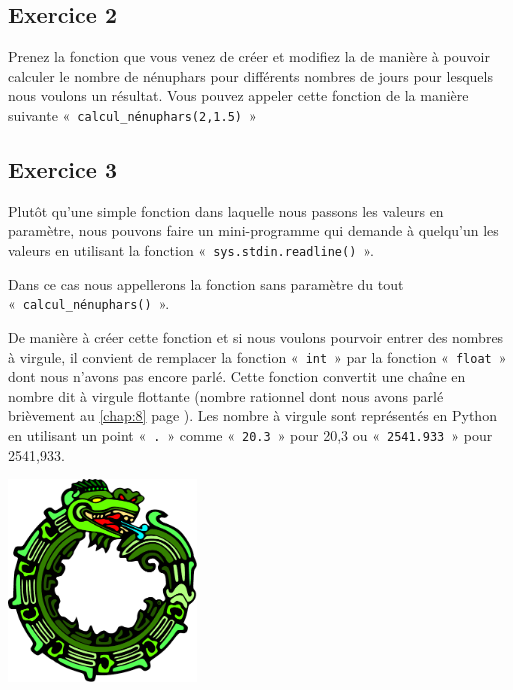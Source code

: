 \subsection{Exercice 2}
Prenez la fonction que vous venez de créer et modifiez la de manière à pouvoir calculer le nombre de nénuphars pour différents nombres de jours pour lesquels nous voulons un résultat.
Vous pouvez appeler cette fonction de la manière suivante «~\texttt{calcul\_nénuphars(2,1.5)}~» 

\subsection{Exercice 3}
Plutôt qu'une simple fonction dans laquelle nous passons les valeurs en paramètre, nous pouvons faire un mini-programme qui demande à quelqu'un les valeurs en utilisant la fonction «~\texttt{sys.stdin.readline()}~».

Dans ce cas nous appellerons la fonction sans paramètre du tout «~\texttt{calcul\_nénuphars()}~».

De manière à créer cette fonction et si nous voulons pourvoir entrer des nombres à virgule, il convient de remplacer la fonction «~\texttt{int}~» par la fonction «~\texttt{float}~» dont nous n'avons pas encore parlé.
Cette fonction convertit une chaîne en nombre dit à virgule flottante (nombre rationnel dont nous avons parlé brièvement au \autoref{chap:8} page \pageref{chap:8}). Les nombre à virgule sont représentés en Python en utilisant un point «~\texttt{.}~» comme «~\texttt{20.3}~» pour 20,3 ou «~\texttt{2541.933}~»  pour 2541,933.


 \vfill
\begin{center}
 \includegraphics[width=5cm]{images/ourochin.pdf}
\end{center}
 \vfill